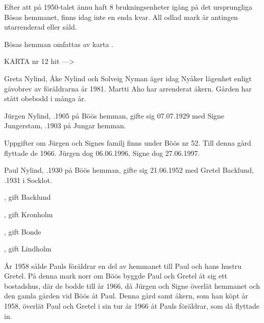 Efter att på 1950-talet ännu haft 8 brukningsenheter igång på det ursprungliga Bösas hemmanet, finns idag inte en enda kvar. All odlad  mark är antingen  utarrenderad eller såld.

Bösas hemman omfattas av karta .

KARTA nr 12 hit --->




Greta Nylind, Åke Nylind och Solveig Nyman äger idag Nyåker lägenhet enligt gåvobrev av föräldrarna år 1981.
Martti Aho har arrenderat åkern. Gården har stått obebodd i många år.


Jürgen Nylind, .1905 på Böös hemman, gifte sig 07.07.1929 med Signe Jungerstam, .1903 på Jungar hemman.
\begin{jhchildren}
  \item {}
  \item {}
  \item {}
  \item {}
  \item {}
  \item {}
\end{jhchildren}
Uppgifter om Jürgen och Signes familj finns under Böös nr 52. Till denna gård flyttade de 1966.
Jürgen dog 06.06.1996, Signe dog 27.06.1997.


Paul Nylind, .1930 på Böös hemman, gifte sig 21.06.1952 med Gretel Backlund, .1931 i Socklot.
\begin{jhchildren}
  \item {}, gift Backlund
  \item {}, gift Kronholm
  \item {}, gift Bonde
  \item {}, gift Lindholm
\end{jhchildren}
År 1958 sålde Pauls föräldrar en del av hemmanet till Paul och hans hustru Gretel. På denna mark norr om Böös byggde Paul och Gretel åt sig ett bostadshus, där de bodde till år 1966, då Jürgen och Signe överlät hemmanet och den gamla gården vid Böös åt Paul. Denna gård samt åkern, som han köpt år 1958, överlät Paul och Gretel i sin tur år 1966 åt Pauls föräldrar, som då flyttade in.



